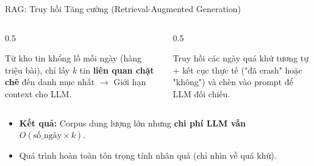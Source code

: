 \documentclass[aspectratio=169, 10pt]{beamer}
\begin{document}
\begin{frame}{RAG: Truy hồi Tăng cường (Retrieval-Augmented Generation)}
    \begin{columns}
        \begin{column}{0.5\textwidth}
            \begin{tcolorbox}[title=Vai trò 1: Chọn lọc, colback=white, colframe=mygreen, boxrule=0.5mm]
                Từ kho tin khổng lồ mỗi ngày (hàng triệu bài), chỉ lấy $k$ tin \textbf{liên quan chặt chẽ} đến danh mục nhất $\rightarrow$ Giới hạn context cho LLM.
            \end{tcolorbox}
        \end{column}
        \begin{column}{0.5\textwidth}
            \begin{tcolorbox}[title=Vai trò 2: Few-shot theo tình huống, colback=white, colframe=mygreen, boxrule=0.5mm]
                Truy hồi các ngày quá khứ tương tự + kết cục thực tế ("đã crash" hoặc "không") và chèn vào prompt để LLM đối chiếu.
            \end{tcolorbox}
        \end{column}
    \end{columns}
    \vspace{0.3cm}
    \begin{itemize}
        \item \textbf{Kết quả:} Corpus dung lượng lớn nhưng \textbf{chi phí LLM vẫn $O(\text{số\_ngày} \times k)$}.
        \item Quá trình hoàn toàn tôn trọng tính nhân quả (chỉ nhìn về quá khứ).
    \end{itemize}
\end{frame}
\end{document}
